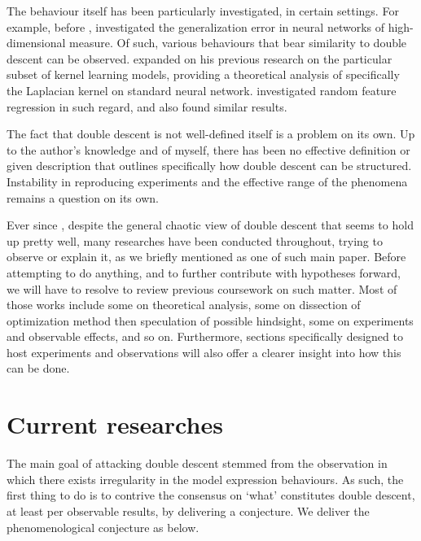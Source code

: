 \documentclass[
  journal=largetwo,
  year=2025,
  volume=37,
]{cup-journal}
\begin{document}
The behaviour itself has been particularly investigated, in certain settings. For example, before \cite{belkin_reconciling_2019}, \cite{advani2017highdimensionaldynamicsgeneralizationerror} investigated the generalization error in neural networks of high-dimensional measure. Of such, various behaviours that bear similarity to double descent can be observed. \cite{belkin2018understanddeeplearningneed} expanded on his previous research on the particular subset of kernel learning models, providing a theoretical analysis of specifically the Laplacian kernel on standard neural network. \cite{mei2020generalizationerrorrandomfeatures} investigated random feature regression in such regard, and also found similar results. 

The fact that double descent is not well-defined itself is a problem on its own. Up to the author's knowledge and of myself, there has been no effective definition or given description that outlines specifically how double descent can be structured. Instability in reproducing experiments and the effective range of the phenomena remains a question on its own. 


Ever since \cite{belkin_reconciling_2019}, despite the general chaotic view of double descent that seems to hold up pretty well, many researches have been conducted throughout, trying to observe or explain it, as we briefly mentioned \cite{nakkiran_deep_2019} as one of such main paper. Before attempting to do anything, and to further contribute with hypotheses forward, we will have to resolve to review previous coursework on such matter. Most of those works include some on theoretical analysis, some on dissection of optimization method then speculation of possible hindsight, some on experiments and observable effects, and so on. Furthermore, sections specifically designed to host experiments and observations will also offer a clearer insight into how this can be done. 

\section{Current researches}

The main goal of attacking double descent stemmed from the observation in which there exists irregularity in the model expression behaviours. As such, the first thing to do is to contrive the consensus on `what' constitutes double descent, at least per observable results, by delivering a conjecture. We deliver the phenomenological conjecture as below. 
\end{document}
